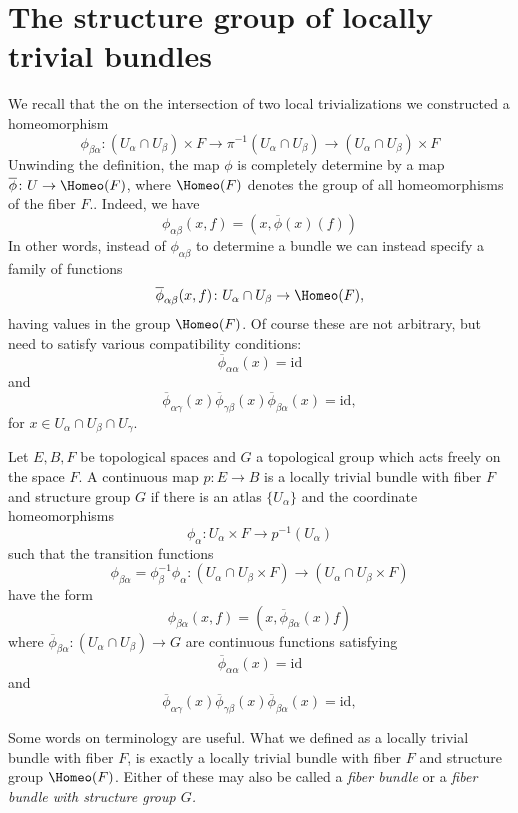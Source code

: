 \documentclass[ma3408.tex]{subfiles}
\begin{document}
\section{The structure group of locally trivial bundles}
We recall that the on the intersection of two local trivializations we constructed a homeomorphism
\[
\phi_{\beta\alpha} \colon {(U_{\alpha} \cap U_{\beta}) \times F} \to {\pi^{-1}(U_{\alpha} \cap U_{\beta})} \to {(U_{\alpha} \cap U_{\beta}) \times F} 
\]
Unwinding the definition, the map $\phi$ is completely determine by a map $\overline \phi \colon U \to \Homeo(F)$, where $\Homeo(F)$ denotes the group of all homeomorphisms of the fiber $F$.. Indeed, we have
\[
\phi_{\alpha\beta}(x,f) = (x,\overline{\phi}(x)(f))
\]
In other words, instead of $\phi_{\alpha\beta}$ to determine a bundle we can instead specify a family of functions
\[
\overline \phi_{\alpha\beta}(x,f) \colon U_{\alpha} \cap U_{\beta} \to \Homeo(F),
\]
having values in the group $\Homeo(F)$. Of course these are not arbitrary, but need to satisfy various compatibility conditions:
\[
\overline \phi_{\alpha\alpha}(x) = \text{id} 
\]
and 
\[
\overline \phi_{\alpha\gamma}(x)\overline \phi_{\gamma\beta}(x)\overline \phi_{\beta\alpha}(x) = \text{id},
\]
for $x \in U_{\alpha} \cap U_{\beta} \cap U_{\gamma}$.
\begin{Def}
Let $E,B,F$ be topological spaces and $G$ a topological group which acts freely on the space $F$. A continuous map $p \colon E \to B$ is a locally trivial bundle with fiber $F$ and structure group $G$ if there is an atlas $\{ U_{\alpha} \}$ and the coordinate homeomorphisms
\[
\phi_{\alpha} \colon U_{\alpha} \times F \to p^{-1}(U_{\alpha})
\]
such that the transition functions
\[
\phi_{\beta\alpha} = \phi_{\beta}^{-1}\phi_{\alpha} \colon (U_{\alpha} \cap U_{\beta} \times F) \to (U_{\alpha} \cap U_{\beta} \times F)
\]
have the form
\[
\phi_{\beta\alpha}(x,f) = (x,\overline{\phi}_{\beta\alpha}(x)f)
\]
where $\overline \phi_{\beta\alpha} \colon (U_{\alpha} \cap U_{\beta}) \to G$ are continuous functions satisfying 
\[
\overline \phi_{\alpha\alpha}(x) = \text{id} 
\]
and 
\[
\overline \phi_{\alpha\gamma}(x)\overline \phi_{\gamma\beta}(x)\overline \phi_{\beta\alpha}(x) = \text{id},
\]
\end{Def}
\begin{Rem}
Some words on terminology are useful. What we defined as a locally trivial bundle with fiber $F$, is exactly a locally trivial bundle with fiber $F$ and structure group $\Homeo(F)$. Either of these may also be called a \emph{fiber bundle} or a \emph{fiber bundle with structure group $G$.}
\end{Rem}
\end{document}
